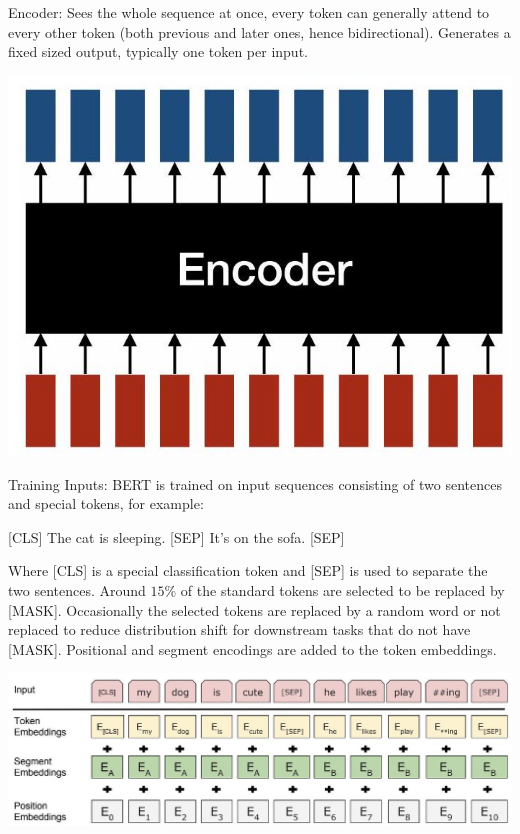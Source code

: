 \documentclass[10pt]{article}
\begin{document}
Encoder: Sees the whole sequence at once, every token can generally attend to every other token (both previous and later ones, hence bidirectional). Generates a fixed sized output, typically one token per input.

\begin{center}
\includegraphics[max width=\textwidth]{2024_01_08_7c14f4867d7823fc5a52g-04}
\end{center}

Training Inputs: BERT is trained on input sequences consisting of two sentences and special tokens, for example:

[CLS] The cat is sleeping. [SEP] It's on the sofa. [SEP]

Where [CLS] is a special classification token and [SEP] is used to separate the two sentences. Around $15 \%$ of the standard tokens are selected to be replaced by [MASK]. Occasionally the selected tokens are replaced by a random word or not replaced to reduce distribution shift for downstream tasks that do not have [MASK]. Positional and segment encodings are added to the token embeddings.

\begin{center}
\includegraphics[max width=\textwidth]{2024_01_08_7c14f4867d7823fc5a52g-05}
\end{center}
\end{document}
